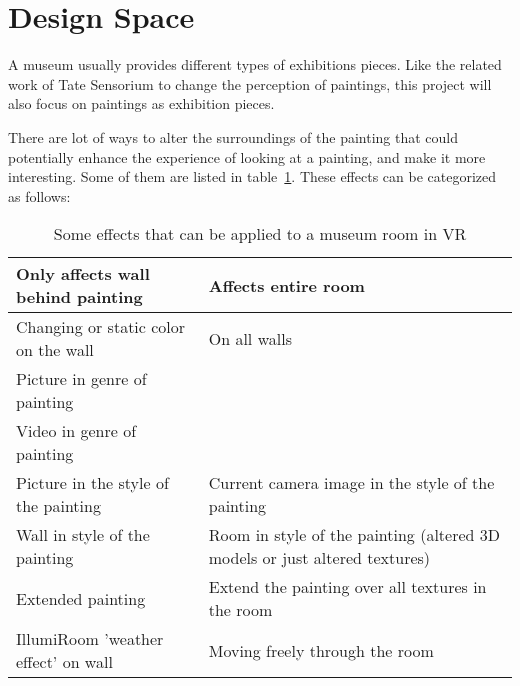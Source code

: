 \documentclass[a4paper]{article}
\begin{document}


\section{Design Space}

A museum usually provides different types of exhibitions pieces. Like the related work of Tate Sensorium to change the perception of paintings, this project will also focus on paintings as exhibition pieces.

There are lot of ways to alter the surroundings of the painting that could potentially enhance the experience of looking at a painting, and make it more interesting. Some of them are listed in table~\ref{tab:effect_ideas}. These effects can be categorized as follows:
\begin{table}
\begin{tabular}{ | p{5.5cm} | p{5.7cm} | }
\hline
\textbf{Only affects wall behind painting} & \textbf{Affects entire room} \\\hline
Changing or static color on the wall & On all walls \\\hline
Picture in genre of painting & \\\hline
Video in genre of painting & \\\hline
Picture in the style of the painting & Current camera image in the style of the painting \\\hline
Wall in style of the painting & Room in style of the painting (altered 3D models or just altered textures) \\\hline
Extended painting & Extend the painting over all textures in the room \\\hline
IllumiRoom 'weather effect' on wall & Moving freely through the room  \\\hline
\end{tabular}
\caption{Some effects that can be applied to a museum room in VR}
\label{tab:effect_ideas}
\end{table}
\end{document}
